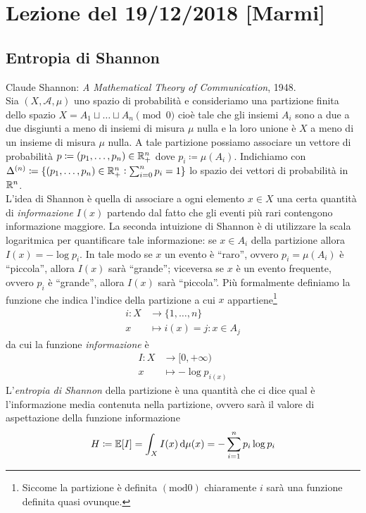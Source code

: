 \section{Lezione del 19/12/2018 [Marmi]}

\subsection{Entropia di Shannon}
Claude Shannon: \emph{A Mathematical Theory of Communication}, 1948. \\

Sia $ (X, \mathcal{A}, \mu) $ uno spazio di probabilità e consideriamo una partizione finita dello spazio \linebreak $ X = A_1 \sqcup \ldots \sqcup A_n \pmod{0} $ cioè tale che gli insiemi $ A_i $ sono a due a due disgiunti a meno di insiemi di misura $ \mu $ nulla e la loro unione è $ X $ a meno di un insieme di misura $ \mu $ nulla. A tale partizione possiamo associare un vettore di probabilità $ p \coloneqq (p_1, \ldots, p_n) \in \mathbb{R}^n_+ $ dove $ p_i \coloneqq \mu(A_i) $. Indichiamo con $ \Delta^{(n)} \coloneqq \{(p_1, \ldots, p_n) \in \mathbb{R}^n_+ : \sum_{i=0}^{n} p_i=1\} $ lo spazio dei vettori di probabilità in $ \mathbb{R}^n $. \\

L'idea di Shannon è quella di associare a ogni elemento $ x \in X $ una certa quantità di \emph{informazione} $ I(x) $ partendo dal fatto che gli eventi più rari contengono informazione maggiore. La seconda intuizione di Shannon è di utilizzare la scala logaritmica per quantificare tale informazione: se $ x \in A_i $ della partizione allora $ I(x) = -\log p_i $. In tale modo se $ x $ un evento è ``raro'', ovvero $ p_i=\mu(A_i) $ è ``piccola'', allora $ I(x) $ sarà ``grande''; viceversa se $ x $ è un evento frequente, ovvero $ p_i $ è ``grande'', allora $ I(x) $ sarà ``piccola''. Più formalmente definiamo la funzione che indica l'indice della partizione a cui $ x $ appartiene\footnote{Siccome la partizione è definita $ (\mathrm{mod} 0) $ chiaramente $ i $ sarà una funzione definita quasi ovunque.}
\begin{align*}
    i \colon X & \to \{1, \ldots, n\} \\
    x & \mapsto i(x) = j : x \in A_{j}
\end{align*}
da cui la funzione \emph{informazione} è
\begin{align*}
    I \colon X & \to [0, +\infty) \\
    x & \mapsto -\log p_{i(x)}
\end{align*}
L'\emph{entropia di Shannon} della partizione è una quantità che ci dice qual è l'informazione media contenuta nella partizione, ovvero sarà il valore di aspettazione della funzione informazione
\begin{equation} \label{eqn:entropia-shannon}
    H \coloneqq \mathbb{E}[I] = \int_{X} I(x) \dif{\mu(x)} = -\sum_{i=1}^{n} p_i \log{p_i}
\end{equation}

